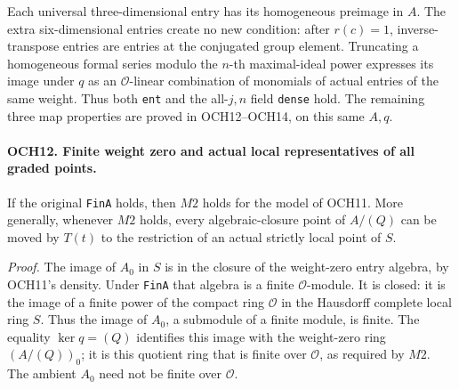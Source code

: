 \documentclass[11pt,a4paper]{article}
\numberwithin{equation}{section}
\theoremstyle{remark}\newtheorem{remark}[theorem]{Remark}
\begin{document}
Each universal three-dimensional entry has its homogeneous
preimage in \(A\).  The extra six-dimensional entries create
no new condition: after \(r(c)=1\), inverse-transpose entries
are entries at the conjugated group element.  Truncating a
homogeneous formal series modulo the \(n\)-th maximal-ideal
power expresses its image under \(q\) as an
\(\mathcal O\)-linear combination of monomials of actual
entries of the same weight.  Thus both \texttt{ent} and the
all-\(j,n\) field \texttt{dense} hold.  The remaining three
map properties are proved in OCH12--OCH14, on this same \(A,q\).

\paragraph{OCH12. Finite weight zero and actual local representatives of all graded points.}
\label{claim:OCH12}
If the original \texttt{Fin\allowbreak A} holds, then
\(M2\) holds for the model of OCH11.  More generally, whenever
\(M2\) holds, every algebraic-closure point of \(A/(Q)\)
can be moved by \(T(t)\) to the restriction of an actual
strictly local point of \(S\).

\emph{Proof.}
The image of \(A_0\) in \(S\) is in the closure of the
weight-zero entry algebra, by OCH11's density.  Under
\texttt{Fin\allowbreak A} that algebra is a finite \(\mathcal O\)-module.
It is closed: it is the image of a finite power of the compact ring
\(\mathcal O\) in the Hausdorff complete local ring \(S\).
Thus the image of \(A_0\), a submodule of a finite module, is
finite.  The equality \(\ker q=(Q)\) identifies this image
with the weight-zero ring \((A/(Q))_0\); it is this quotient
ring that is finite over \(\mathcal O\), as required by
\(M2\).  The ambient \(A_0\) need not be finite over
\(\mathcal O\).
\end{document}
